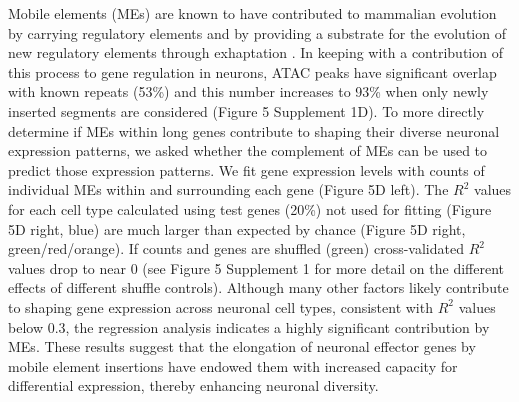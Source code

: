 Mobile elements (MEs) are known to have contributed to mammalian evolution by carrying regulatory elements \citep{Johnson_2006,Chuong_2016a} and by providing a substrate for the evolution of new regulatory elements through exhaptation \citep{Mikkelsen_2007,Sasaki_2008}. In keeping with a contribution of this process to gene regulation in neurons, ATAC peaks have significant overlap with known repeats (53\%) and this number increases to 93\% when only newly inserted segments are considered (Figure 5 Supplement 1D). To more directly determine if MEs within long genes contribute to shaping their diverse neuronal expression patterns, we asked whether the complement of MEs can be used to predict those expression patterns. We fit gene expression levels with counts of individual MEs within and surrounding each gene (Figure 5D left). The $R^2$ values for each cell type calculated using test genes (20\%) not used for fitting (Figure 5D right, blue) are much larger than expected by chance (Figure 5D right, green/red/orange). If counts and genes are shuffled (green) cross-validated $R^2$ values drop to near 0 (see Figure 5 Supplement 1 for more detail on the different effects of different shuffle controls). 
Although many other factors likely contribute to shaping gene expression across neuronal cell types, consistent with $R^2$ values below 0.3, the regression analysis indicates a highly significant contribution by MEs. These results suggest that the elongation of neuronal effector genes by mobile element insertions have endowed them with increased capacity for differential expression, thereby  enhancing neuronal diversity. 

